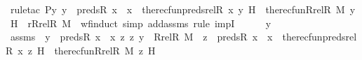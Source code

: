 \begin{isabellebody}
\ {\isacharparenleft}{\kern0pt}rule{\isacharunderscore}{\kern0pt}tac\ P{\isacharequal}{\kern0pt}{\isachardoublequoteopen}{\isasymlambda}y{\isachardot}{\kern0pt}\ y\ {\isasymin}\ preds{\isacharparenleft}{\kern0pt}R{\isacharcomma}{\kern0pt}\ x{\isacharparenright}{\kern0pt}\ {\isasymunion}\ {\isacharbraceleft}{\kern0pt}x{\isacharbraceright}{\kern0pt}\ {\isasymlongrightarrow}\ the{\isacharunderscore}{\kern0pt}recfun{\isacharparenleft}{\kern0pt}preds{\isacharunderscore}{\kern0pt}rel{\isacharparenleft}{\kern0pt}R{\isacharcomma}{\kern0pt}\ x{\isacharparenright}{\kern0pt}{\isacharcomma}{\kern0pt}\ y{\isacharcomma}{\kern0pt}\ H{\isacharparenright}{\kern0pt}\ {\isacharequal}{\kern0pt}\ the{\isacharunderscore}{\kern0pt}recfun{\isacharparenleft}{\kern0pt}Rrel{\isacharparenleft}{\kern0pt}R{\isacharcomma}{\kern0pt}\ M{\isacharparenright}{\kern0pt}{\isacharcomma}{\kern0pt}\ y{\isacharcomma}{\kern0pt}\ H{\isacharparenright}{\kern0pt}{\isachardoublequoteclose}\ \ r{\isacharequal}{\kern0pt}{\isachardoublequoteopen}Rrel{\isacharparenleft}{\kern0pt}R{\isacharcomma}{\kern0pt}\ M{\isacharparenright}{\kern0pt}{\isachardoublequoteclose}\ \ wf{\isacharunderscore}{\kern0pt}induct{\isacharcomma}{\kern0pt}\ simp\ add{\isacharcolon}{\kern0pt}assms{\isacharcomma}{\kern0pt}\ rule\ impI{\isacharparenright}{\kern0pt}\isanewline
\ \ \ \ \isamarkupfalse%
\ y\ \ \isanewline
\ \ \ \ \isamarkupfalse%
\ assms{}\ {\isacharcolon}{\kern0pt}\ {\isachardoublequoteopen}y\ {\isasymin}\ preds{\isacharparenleft}{\kern0pt}R{\isacharcomma}{\kern0pt}\ x{\isacharparenright}{\kern0pt}\ {\isasymunion}\ {\isacharbraceleft}{\kern0pt}x{\isacharbraceright}{\kern0pt}{\isachardoublequoteclose}\ {\isachardoublequoteopen}{\isacharparenleft}{\kern0pt}{\isasymAnd}z{\isachardot}{\kern0pt}\ {\isasymlangle}z{\isacharcomma}{\kern0pt}\ y{\isasymrangle}\ {\isasymin}\ Rrel{\isacharparenleft}{\kern0pt}R{\isacharcomma}{\kern0pt}\ M{\isacharparenright}{\kern0pt}\ {\isasymLongrightarrow}\ z\ {\isasymin}\ preds{\isacharparenleft}{\kern0pt}R{\isacharcomma}{\kern0pt}\ x{\isacharparenright}{\kern0pt}\ {\isasymunion}\ {\isacharbraceleft}{\kern0pt}x{\isacharbraceright}{\kern0pt}\ {\isasymlongrightarrow}\ the{\isacharunderscore}{\kern0pt}recfun{\isacharparenleft}{\kern0pt}preds{\isacharunderscore}{\kern0pt}rel{\isacharparenleft}{\kern0pt}R{\isacharcomma}{\kern0pt}\ x{\isacharparenright}{\kern0pt}{\isacharcomma}{\kern0pt}\ z{\isacharcomma}{\kern0pt}\ H{\isacharparenright}{\kern0pt}\ {\isacharequal}{\kern0pt}\ the{\isacharunderscore}{\kern0pt}recfun{\isacharparenleft}{\kern0pt}Rrel{\isacharparenleft}{\kern0pt}R{\isacharcomma}{\kern0pt}\ M{\isacharparenright}{\kern0pt}{\isacharcomma}{\kern0pt}\ z{\isacharcomma}{\kern0pt}\ H{\isacharparenright}{\kern0pt}{\isacharparenright}{\kern0pt}{\isachardoublequoteclose}\isanewline

\end{isabellebody}
